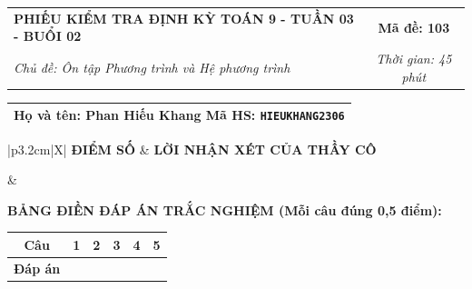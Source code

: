 \documentclass[12pt,a4paper]{article}
\begin{document}
\newpage


\noindent
\begin{tabularx}{\linewidth}{|X|c|}
\hline
\textbf{PHIẾU KIỂM TRA ĐỊNH KỲ TOÁN 9 - TUẦN 03 - BUỔI 02} & \textbf{Mã đề: 103} \\
\textit{Chủ đề: Ôn tập Phương trình và Hệ phương trình} & \textit{Thời gian: 45 phút} \\
\hline
\end{tabularx}

\vspace{1mm}

\noindent
\begin{tabularx}{\linewidth}{|X|}
\hline
\rule[-2mm]{0pt}{7.5mm}\textbf{Họ và tên:} \textbf{\large Phan Hiếu Khang} \hfill \textbf{Mã HS:} \texttt{HIEUKHANG2306} \quad \\
\hline
\end{tabularx}

\vspace{1mm}

\noindent
\begin{tabularx}{\linewidth}{|p{3.2cm}|X|}
\hline
\centering\textbf{ĐIỂM SỐ} & \centering\textbf{LỜI NHẬN XÉT CỦA THẦY CÔ} \tabularnewline
\hline
\rule{0pt}{1.3cm} & \tabularnewline
\hline
\end{tabularx}

\vspace{1.2mm}

\noindent\textbf{BẢNG ĐIỀN ĐÁP ÁN TRẮC NGHIỆM (Mỗi câu đúng 0,5 điểm):}
\vspace{0.8mm}

\noindent
\renewcommand{\arraystretch}{1.35}
\begin{tabularx}{\linewidth}{|c|*{5}{>{\centering\arraybackslash}X|}}
\hline
\textbf{Câu} & \textbf{1} & \textbf{2} & \textbf{3} & \textbf{4} & \textbf{5} \\
\hline
\textbf{Đáp án} & & & & & \\
\hline
\end{tabularx}
\renewcommand{\arraystretch}{1.0}

\vspace{1.5mm}
\end{document}
